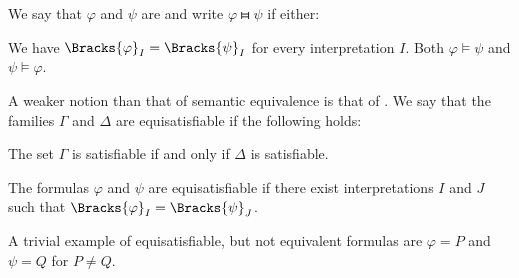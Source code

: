 \begin{definition}
\begin{thmenum}
     We say that \( \varphi \) and \( \psi \) are  and write \( \varphi \gleichstark \psi \) if either:
    \begin{thmenum}
       We have \( \Bracks{\varphi}_I = \Bracks{\psi}_I \) for every interpretation \( I \).
       Both \( \varphi \vDash \psi \) and \( \psi \vDash \varphi \).
    \end{thmenum}

     A weaker notion than that of semantic equivalence is that of . We say that the families \( \Gamma \) and \( \Delta \) are equisatisfiable if the following holds:
    \begin{displayquote}
      The set \( \Gamma \) is satisfiable if and only if \( \Delta \) is satisfiable.
    \end{displayquote}

    The formulas \( \varphi \) and \( \psi \) are equisatisfiable if there exist interpretations \( I \) and \( J \) such that \( \Bracks{\varphi}_I = \Bracks{\psi}_J \).
  \end{thmenum}
\end{definition}

\begin{example}\label{ex:equisatisfiable_not_equivalent}
  A trivial example of equisatisfiable, but not equivalent formulas are \( \varphi = P \) and \( \psi = Q \) for \( P \neq Q \).
\end{example}


